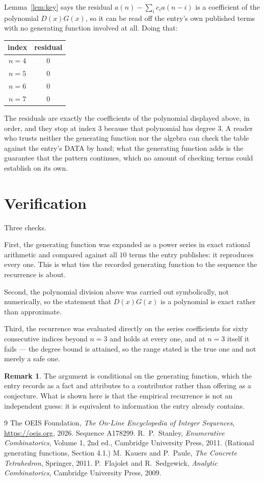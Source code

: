 \documentclass[11pt,a4paper]{article}
\theoremstyle{plain}
\theoremstyle{definition}
\newtheorem{remark}[theorem]{Remark}
\begin{document}
Lemma~\ref{lem:key} says the residual $a(n)-\sum_ic_ia(n-i)$ is a coefficient of the
polynomial $D(x)G(x)$, so it can be read off the entry's own published terms with no
generating function involved at all. Doing that:
\begin{center}
\begin{tabular}{cc}
index & residual \\ \hline
$n=4$ & $0$ \\
$n=5$ & $0$ \\
$n=6$ & $0$ \\
$n=7$ & $0$
\end{tabular}
\end{center}
The residuals are exactly the coefficients of the polynomial displayed above, in order, and
they stop at index $3$ because that polynomial has degree $3$. A reader who trusts
neither the generating function nor the algebra can check the table against the entry's DATA
by hand; what the generating function adds is the guarantee that the pattern continues, which
no amount of checking terms could establish on its own.

\section{Verification}

Three checks.

First, the generating function was expanded as a power series in exact rational arithmetic and
compared against all $10$ terms the entry publishes: it reproduces every one. This is
what ties the recorded generating function to the sequence the recurrence is about.

Second, the polynomial division above was carried out symbolically, not numerically, so the
statement that $D(x)G(x)$ is a polynomial is exact rather than approximate.

Third, the recurrence was evaluated directly on the series coefficients for sixty consecutive
indices beyond $n=3$ and holds at every one, and at $n=3$ itself it fails --- the
degree bound is attained, so the range stated is the true one and not merely a safe one.

\begin{remark}
The argument is conditional on the generating function, which the entry records as a fact and
attributes to a contributor rather than offering as a conjecture. What is shown here is that
the empirical recurrence is not an independent guess: it is equivalent to information the
entry already contains.
\end{remark}

\begin{thebibliography}{9}
 The OEIS Foundation, \emph{The On-Line Encyclopedia of Integer
Sequences}, \url{https://oeis.org}, 2026. Sequence A178299.
 R.~P.~Stanley, \emph{Enumerative Combinatorics}, Volume 1, 2nd ed.,
Cambridge University Press, 2011. (Rational generating functions, Section 4.1.)
 M.~Kauers and P.~Paule, \emph{The Concrete Tetrahedron}, Springer, 2011.
 P.~Flajolet and R.~Sedgewick, \emph{Analytic Combinatorics}, Cambridge
University Press, 2009.
\end{thebibliography}
\end{document}
